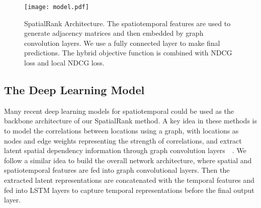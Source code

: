 \documentclass{article}
\begin{document}

\begin{figure}
 \centering
 \texttt{[image: model.pdf]}
 \caption{SpatialRank Architecture. The spatiotemporal features are used to generate adjacency matrices and then embedded by graph convolution layers. We use a fully connected layer to make final predictions. The hybrid objective function is combined with NDCG loss and local NDCG loss.}
 \label{fig: framework}
\end{figure}

\subsection{The Deep Learning Model}
Many recent deep learning models for spatiotemporal could be used as the backbone architecture of our SpatialRank method. A key idea in these methods is to model the correlations between locations using a graph, with locations as nodes and edge weights representing the strength of correlations, and extract latent spatial dependency information through graph convolution layers~\cite{Wang2021gsnet}~\cite{doi:10.1137/1.9781611977172.38}. We follow a similar idea to build the overall network architecture, where spatial and spatiotemporal features are fed into graph convolutional layers. Then the extracted latent representations are concatenated with the temporal features and fed into LSTM layers to capture temporal representations before the final output layer.  
\end{document}
